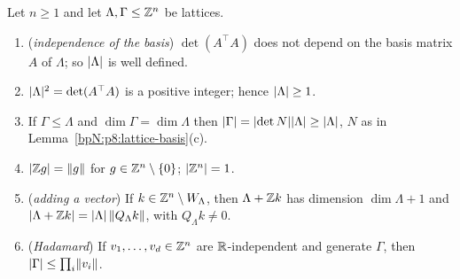 \begin{lemma}[Volume]\label{bpN:p8:lattice-volume}
Let $n\ge1$ and let $\Lambda,\Gamma\le\mathbb{Z}^n$ be lattices.
\begin{enumerate}[label=(\alph*)]
\item (\emph{independence of the basis}) $\det(A^\top A)$ does not depend on the basis matrix $A$ of $\Lambda$; so $\lvert \Lambda\rvert$ is well defined.
\item $\lvert \Lambda\rvert^2=\det(A^\top A)$ is a positive integer; hence $\lvert \Lambda\rvert\ge1$.
\item If $\Gamma\le\Lambda$ and $\dim\Gamma=\dim\Lambda$ then $\lvert \Gamma\rvert=\lvert \det N\rvert\lvert \Lambda\rvert\ge\lvert \Lambda\rvert$, $N$ as in Lemma~\ref{bpN:p8:lattice-basis}(c).
\item $\lvert \mathbb{Z} g\rvert=\lVert g\rVert$ for $g\in\mathbb{Z}^n\setminus\{0\}$; $\lvert \mathbb{Z}^n\rvert=1$.
\item (\emph{adding a vector}) If $k\in\mathbb{Z}^n\setminus W_\Lambda$, then $\Lambda+\mathbb{Z} k$ has dimension $\dim\Lambda+1$ and $\lvert \Lambda+\mathbb{Z} k\rvert=\lvert \Lambda\rvert\,\lVert Q_\Lambda k\rVert$, with $Q_\Lambda k\ne0$.
\item (\emph{Hadamard}) If $v_1,\dots,v_d\in\mathbb{Z}^n$ are $\mathbb{R}$-independent and generate $\Gamma$, then $\lvert \Gamma\rvert\le\prod_i\lVert v_i\rVert$.
\end{enumerate}
\end{lemma}
